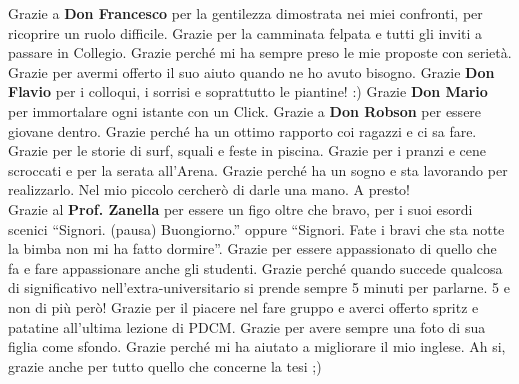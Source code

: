 \documentclass[10pt]{amsart}
\newcommand{\n}[1]{{\Large \bf #1}}
\begin{document}
Grazie a \n{Don Francesco} per la gentilezza dimostrata nei miei confronti, per ricoprire un ruolo difficile. Grazie per la camminata felpata e tutti gli inviti a passare in Collegio. Grazie perché mi ha sempre preso le mie proposte con serietà. Grazie per avermi offerto il suo aiuto quando ne ho avuto bisogno. Grazie \n{Don Flavio} per i colloqui, i sorrisi e soprattutto le piantine! :) Grazie \n{Don Mario} per immortalare ogni istante con un Click. Grazie a \n{Don Robson} per essere giovane dentro. Grazie perché ha un ottimo rapporto coi ragazzi e ci sa fare. Grazie per le storie di surf, squali e feste in piscina. Grazie per i pranzi e cene scroccati e per la serata all'Arena. Grazie perché ha un sogno e sta lavorando per realizzarlo. Nel mio piccolo cercherò di darle una mano. A presto!\\

Grazie al \n{Prof. Zanella} per essere un figo oltre che bravo, per i suoi esordi scenici ``Signori. (pausa) Buongiorno.''  oppure ``Signori. Fate i bravi che sta notte la bimba non mi ha fatto dormire''. Grazie per essere appassionato di quello che fa e fare appassionare anche gli studenti. Grazie perché quando succede qualcosa di significativo nell'extra-universitario si prende sempre 5 minuti per parlarne. 5 e non di più però! Grazie per il piacere nel fare gruppo e averci offerto spritz e patatine all'ultima lezione di PDCM. Grazie per avere sempre una foto di sua figlia come sfondo. Grazie perché mi ha aiutato a migliorare il mio inglese. Ah si, grazie anche per tutto quello che concerne la tesi ;)\\
\end{document}
